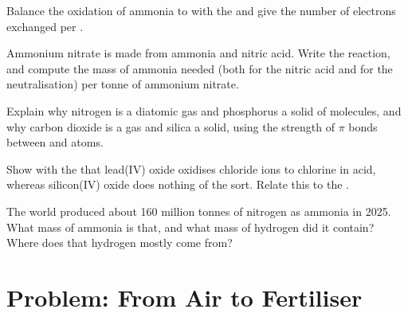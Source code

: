 \begin{exercise}[$\star\star$]\label{exo:b1:p-block-13-15:8}
Balance the oxidation of ammonia to  with the  and
give the number of electrons exchanged per .
\end{exercise}

\begin{exercise}[$\star\star$]\label{exo:b1:p-block-13-15:9}
Ammonium nitrate is made from ammonia and nitric acid. Write the reaction,
and compute the mass of ammonia needed (both for the nitric acid and for
the neutralisation) per tonne of ammonium nitrate.
\end{exercise}

\begin{exercise}[$\star\star\star$]\label{exo:b1:p-block-13-15:10}
Explain why nitrogen is a diatomic gas and phosphorus a solid of 
molecules, and why carbon dioxide is a gas and silica a solid, using the
strength of $\pi$ bonds between  and  atoms.
\end{exercise}

\begin{exercise}[$\star\star\star$]\label{exo:b1:p-block-13-15:11}
Show with the  that lead(IV) oxide oxidises chloride
ions to chlorine in acid, whereas silicon(IV) oxide does nothing of the
sort. Relate this to the .
\end{exercise}

\begin{exercise}[$\star\star\star$]\label{exo:b1:p-block-13-15:12}
The world produced about 160 million tonnes of nitrogen as ammonia in 2025.
What mass of ammonia is that, and what mass of hydrogen did it contain?
Where does that hydrogen mostly come from?
\end{exercise}

\section{Problem: From Air to Fertiliser}

